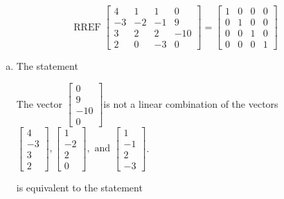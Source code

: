\begin{exerciseAnswer} 
\[\operatorname{RREF}  \left[\begin{array}{ccc|c}
4 & 1 & 1 & 0 \\
-3 & -2 & -1 & 9 \\
3 & 2 & 2 & -10 \\
2 & 0 & -3 & 0
\end{array}\right] = \left[\begin{array}{ccc|c}
1 & 0 & 0 & 0 \\
0 & 1 & 0 & 0 \\
0 & 0 & 1 & 0 \\
0 & 0 & 0 & 1
\end{array}\right] \]
\begin{enumerate}[(a)]
\item  The statement 
\begin{center}\begin{minipage}{0.8\textwidth}
 The vector \( \left[\begin{array}{c}
0 \\
9 \\
-10 \\
0
\end{array}\right] \)is not a linear combination of the vectors \( \left[\begin{array}{c}
4 \\
-3 \\
3 \\
2
\end{array}\right] , \left[\begin{array}{c}
1 \\
-2 \\
2 \\
0
\end{array}\right] , \text{ and } \left[\begin{array}{c}
1 \\
-1 \\
2 \\
-3
\end{array}\right] \). 
\end{minipage}\end{center}
     is equivalent to the statement 
\begin{center}\begin{minipage}{0.8\textwidth}
 The vector equation \( x_{1} \left[\begin{array}{c}
4 \\
-3 \\
3 \\
2
\end{array}\right] + x_{2} \left[\begin{array}{c}

\end{array}
\end{minipage}
\end{center}
\end{enumerate}
\end{exerciseAnswer}
